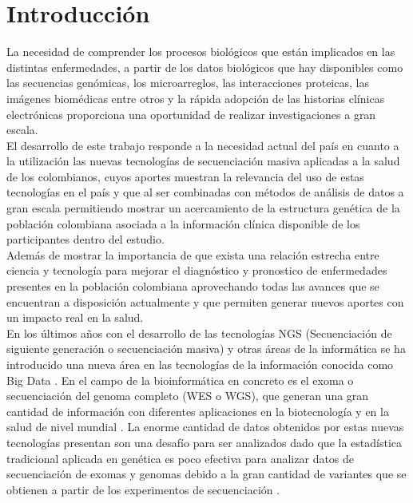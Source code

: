 \chapter{Introducci\'{o}n}

La necesidad de comprender los procesos biológicos que están implicados en las distintas enfermedades, a partir de los datos biológicos que hay disponibles como las secuencias genómicas, los microarreglos, las interacciones proteicas, las imágenes biomédicas entre otros y la rápida adopción de las historias clínicas electrónicas proporciona una oportunidad de realizar investigaciones a gran escala. \\

El desarrollo de este trabajo responde a la necesidad actual del país en cuanto a la utilización las nuevas tecnologías de secuenciación masiva aplicadas a la salud de los colombianos, cuyos aportes muestran la relevancia del uso de estas tecnologías en el país  y que al ser combinadas con métodos de análisis de datos a gran escala permitiendo mostrar un acercamiento de la estructura genética de la población colombiana asociada a la información clínica disponible de los participantes dentro del estudio.\\

Además de mostrar la importancia de que exista una relación estrecha entre ciencia y tecnología para mejorar el diagnóstico y pronostico de enfermedades presentes en la población colombiana aprovechando todas las avances que se encuentran a disposición actualmente y que permiten generar nuevos aportes con un impacto real en la salud.\\

En los últimos años con el desarrollo de las tecnologías NGS (Secuenciación de siguiente generación o secuenciación masiva) y otras áreas de la informática se ha introducido una nueva área en las tecnologías de la información conocida como Big Data \cite{Mohammed2014}. En el campo de la bioinformática en concreto es el exoma o secuenciación del genoma completo (WES o WGS), que generan una gran cantidad de información con diferentes aplicaciones en la biotecnología y en la  salud de nivel mundial \cite{Hwang2015}. La enorme cantidad de datos obtenidos por estas nuevas tecnologías presentan son una desafío para ser analizados dado que la estadística tradicional aplicada en genética es poco efectiva para analizar datos de secuenciación de exomas y genomas debido a la gran cantidad de variantes que se obtienen a partir de los experimentos de secuenciación \cite{Wu2014,Mohammed2014}.\\


